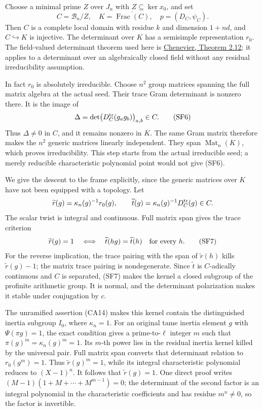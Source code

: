 Choose a minimal prime \(Z\) over \(J_n\) with
\(Z\subseteq\ker x_0\), and set
\[
 C=\mathcal B_n/Z,\quad
 K=\overline{\operatorname{Frac}(C)},\quad
 p=(D_C,\psi_C).
\]
Then \(C\) is a complete local domain with residue \(k\)
and dimension \(1+nd\), and \(C\hookrightarrow K\)
is injective.
The determinant over \(K\) has a semisimple
representation \(r_0\).
The field-valued determinant theorem used here is
\href{https://gaetan.chenevier.perso.math.cnrs.fr/articles/determinants.pdf}
{Chenevier, Theorem 2.12}; it applies to a determinant
over an algebraically closed field without any
residual irreducibility assumption.

In fact \(r_0\) is absolutely irreducible.
Choose \(n^2\) group matrices spanning the full matrix
algebra at the actual seed. Their trace Gram determinant
is nonzero there. It is the image of
\[
          \Delta=\det\bigl(D_C^{\rm tr}(g_ag_b)\bigr)_{a,b}
                                                        \in C .
                                                               \tag{SF6}
\]
Thus \(\Delta\ne0\) in \(C\), and it remains nonzero
in \(K\). The same Gram matrix therefore makes the
\(n^2\) generic matrices linearly independent.
They span \(\operatorname{Mat}_n(K)\), which proves
irreducibility. This step starts from the actual
irreducible seed; a merely reducible characteristic
polynomial point would not give (SF6).

We give the descent to the frame explicitly, since the
generic matrices over \(K\) have not been equipped with
a topology. Let
\[
 \widetilde r(g)=\kappa_n(g)^{-1}r_0(g),\qquad
 \widetilde t(g)=\kappa_n(g)^{-1}D_C^{\rm tr}(g)\in C .
\]
The scalar twist is integral and continuous.
Full matrix span gives the trace criterion
\[
 \widetilde r(g)=1
 \quad\Longleftrightarrow\quad
 \widetilde t(hg)=\widetilde t(h)\quad\hbox{for every }h .
                                                               \tag{SF7}
\]
For the reverse implication, the trace pairing with
the span of \(\widetilde r(h)\) kills
\(\widetilde r(g)-1\); the matrix trace pairing is
nondegenerate. Since \(\widetilde t\) is \(C\)-adically
continuous and \(C\) is separated, (SF7) makes the
kernel a closed subgroup of the profinite arithmetic
group. It is normal, and the determinant polarization
makes it stable under conjugation by \(c\).

The unramified assertion (CA14) makes this kernel
contain the distinguished inertia subgroup \(I_0\),
where \(\kappa_n=1\).
For an original tame inertia element \(g\) with
\(\Psi(\pi g)=1\), the exact 
condition gives a prime-to-\(\ell\) integer \(m\)
such that
\(\pi(g)^m=\kappa_n(g)^m=1\).
Its \(m\)-th power lies in the residual inertia
kernel killed by the universal pair.
Full matrix span converts that determinant relation
to \(r_0(g^m)=1\).
Thus \(\widetilde r(g)^m=1\), while its integral
characteristic polynomial reduces to \((X-1)^n\).
It follows that \(\widetilde r(g)=1\).
One direct proof writes
\((M-1)(1+M+\cdots+M^{m-1})=0\);
the determinant of the second factor is an integral
polynomial in the characteristic coefficients and
has residue \(m^n\ne0\), so the factor is invertible.

